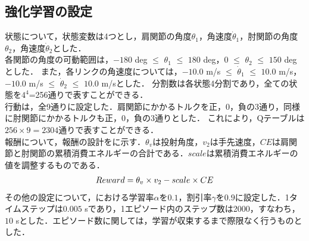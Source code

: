\begin{small}
\subsection{強化学習の設定}
状態について，状態変数は4つとし，肩関節の角度$\theta_{1}$，角速度$\dot{\theta}_{1}$，肘関節の角度$\theta_{2}$，角速度$\dot{\theta}_{2}$とした．\\
各関節の角度の可動範囲は，$-180$ deg $\le$ $\theta_{1}$ $\le$ $180$ deg，$0$ $\le$ $\theta_{2}$ $\le$ $150$ deg\cite{range}とした．
また，各リンクの角速度については，$-10.0$ m/s $\le$ $\dot{\theta}_{1}$ $\le$ $10.0$ m/s，$-10.0$ m/s $\le$ $\dot{\theta}_{2}$ $\le$ $10.0$ m/sとした．
分割数は各状態4分割であり，全ての状態を$4^{4}$=256通りで表すことができる．\\
行動は，全9通りに設定した．肩関節にかかるトルクを正，0，負の3通り，同様に肘関節にかかるトルクも正，0，負の3通りとした．
これにより，Qテーブルは$256 \times 9=2304$通りで表すことができる．\\
報酬について，報酬の設計をに示す．$\theta_{v}$は投射角度，$v_{2}$は手先速度，$CE$は肩関節と肘関節の累積消費エネルギーの合計である．$scale$は累積消費エネルギーの値を調整するものである．
\begin{eqnarray}
  \equlabel{9}
  Reward = \theta_{v} \times v_{2} - scale \times CE
\end{eqnarray}
その他の設定について，における学習率$\alpha$を$0.1$，割引率$\gamma$を$0.9$に設定した．1タイムステップは$0.005$ sであり，1エピソード内のステップ数は2000，すなわち，$10$ sとした．エピソード数に関しては，学習が収束するまで際限なく行うものとした．

\end{small}
